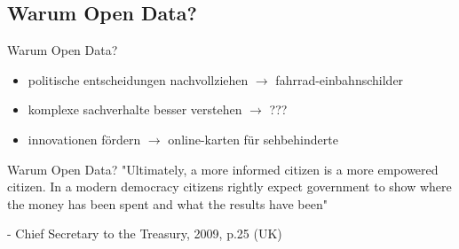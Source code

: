 \subsection{Warum Open Data?}
\begin{frame}[t]{Warum Open Data?}
 \begin{itemize}
  \item politische entscheidungen nachvollziehen $\rightarrow$ fahrrad-einbahnschilder
  \item komplexe sachverhalte besser verstehen $\rightarrow$ ???
  \item innovationen fördern $\rightarrow$ online-karten für sehbehinderte
 \end{itemize}
\end{frame}

\begin{frame}{Warum Open Data?}
 "Ultimately, a more informed citizen is a more empowered citizen. In a modern democracy citizens rightly expect government to show where the money has been spent and what the results have been"
 
 - Chief Secretary to the Treasury, 2009, p.25 (UK)
\end{frame}